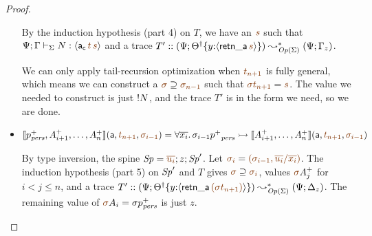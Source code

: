 \begin{proof}
\begin{itemize}
  \smallskip
  By the induction hypothesis (part 4) on $T$, we have an $\lf{s}$ such
  that $\slst{\Sigma}{\Psi}{\Gamma}{N}{\susp{{\sf a_c}\,\lf{t}\,\lf{s}}}$ and a 
  trace
  $T' :: (\Psi; \tackon{\opsubst{\Theta}}{y{:}\susp{{\sf retn\_a}\,\lf{s}}}) 
   \leadsto^*_{\transop{\Sigma}}
  (\Psi; \Gamma_z)$. 


  \smallskip
  We can only apply tail-recursion optimization when $\lf{t_{n+1}}$ is 
  fully general, which means we can construct
  a $\lf{\sigma} \supseteq \lf{\sigma_{n-1}}$ such that $\lf{\sigma{t_{n+1}}} = \lf{s}$. The value we needed to construct is just 
  ${!}{{N}}$, and the trace $T'$ is in the form we need,
  so we are done.
  \bigskip

\item $\opbasic{p^+_\mpers,A^+_{i+1},\ldots,A^+_n}{t_{n+1}}{\sigma_{i-1}} 
  = \forall \overline{x_i}.\, \sigma_{i-1}{p^+}_\mpers \lefti \opbasic{A^+_{i+1},\ldots,A^+_n}{t_{n+1}}{\sigma_{i-1}}$
 
  \bigskip
  By type inversion, the spine
  $\Sp = \lf{\overline{u_i}}; z; \Sp'$.
  Let $\lf{\sigma_i} = \lf{(\sigma_{i-1},\overline{u_i}/\overline{x_i})}$. The
  induction hypothesis (part 5) on ${\it Sp}'$ and $T$
  gives $\lf{\sigma} \supseteq \lf{\sigma_{i}}$, values
  $\lf\sigma{A^+_{j}}$ for $i < j \leq n$, and 
  a trace $T' :: (\Psi; \tackon{\opsubst{\Theta}}{y{:}\susp{{\sf retn\_a}\,\lf{(\sigma t_{n+1})}}})
  \leadsto^*_{\transop{\Sigma}}
 (\Psi; \Delta_z)$. The remaining value of $\lf\sigma A_i = \sigma{p^+_\mpers}$
  is just $z$.
  \bigskip


\end{itemize}
\end{proof}
